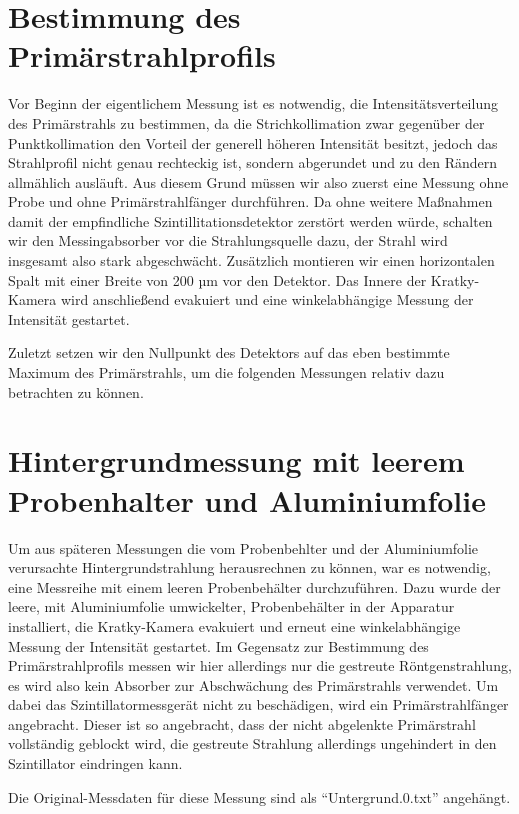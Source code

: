 \documentclass[bigchapter,colorback,accentcolor=tud4b,linedtoc,11pt]{tudreport}
\begin{document}
\section{Bestimmung des Primärstrahlprofils}

Vor Beginn der eigentlichem Messung ist es notwendig, die Intensitätsverteilung des Primärstrahls zu bestimmen, da die Strichkollimation zwar gegenüber der Punktkollimation den Vorteil der generell höheren Intensität besitzt, jedoch das Strahlprofil nicht genau rechteckig ist, sondern abgerundet und zu den Rändern allmählich ausläuft. Aus diesem Grund müssen wir also zuerst eine Messung ohne Probe und ohne Primärstrahlfänger durchführen. Da ohne weitere Maßnahmen damit der empfindliche Szintillitationsdetektor zerstört werden würde, schalten wir den Messingabsorber vor die Strahlungsquelle dazu, der Strahl wird insgesamt also stark abgeschwächt. Zusätzlich montieren wir einen horizontalen Spalt mit einer Breite von 200 µm vor den Detektor. Das Innere der Kratky-Kamera wird anschließend evakuiert und eine winkelabhängige Messung der Intensität gestartet. 

Zuletzt setzen wir den Nullpunkt des Detektors auf das eben bestimmte Maximum des Primärstrahls, um die folgenden Messungen relativ dazu betrachten zu können.

\section{Hintergrundmessung mit leerem Probenhalter und Aluminiumfolie}
Um aus späteren Messungen die vom Probenbehlter und der Aluminiumfolie verursachte Hintergrundstrahlung herausrechnen zu können, war es notwendig, eine Messreihe mit einem leeren Probenbehälter durchzuführen. Dazu wurde der leere, mit Aluminiumfolie umwickelter, Probenbehälter in der Apparatur installiert, die Kratky-Kamera evakuiert und erneut eine winkelabhängige Messung der Intensität gestartet. Im Gegensatz zur Bestimmung des Primärstrahlprofils messen wir hier allerdings nur die gestreute Röntgenstrahlung, es wird also kein Absorber zur Abschwächung des Primärstrahls verwendet. Um dabei das Szintillatormessgerät nicht zu beschädigen, wird ein Primärstrahlfänger angebracht. Dieser ist so angebracht, dass der nicht abgelenkte Primärstrahl vollständig geblockt wird, die gestreute Strahlung allerdings ungehindert in den Szintillator eindringen kann.

Die Original-Messdaten für diese Messung sind als "`Untergrund.0.txt"' angehängt.
\end{document}
